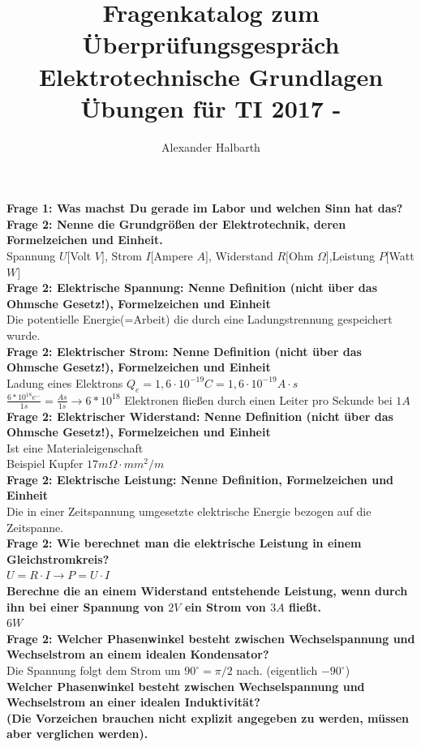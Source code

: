 \documentclass[11pt,a4paper]{scrartcl}
\author{Alexander Halbarth}
\title{\textbf{Fragenkatalog zum Überprüfungsgespräch Elektrotechnische Grundlagen Übungen für TI 2017 - \UE}}
\begin{document}
\maketitle
\textbf{Frage 1: Was machst Du gerade im Labor und welchen Sinn hat das?}\\
\textbf{Frage 2: Nenne die Grundgrößen der Elektrotechnik, deren Formelzeichen und Einheit.}\\
Spannung $U[$Volt $V]$, Strom $I[$Ampere $A]$, Widerstand $R[$Ohm $\Omega]$,Leistung $P[$Watt $W]$\\
\textbf{Frage 2: Elektrische Spannung: Nenne Definition (nicht über das Ohmsche Gesetz!), Formelzeichen und Einheit}\\
Die potentielle Energie(=Arbeit) die durch eine Ladungstrennung gespeichert wurde.\\
\textbf{Frage 2: Elektrischer Strom: Nenne Definition (nicht über das Ohmsche Gesetz!), Formelzeichen und Einheit}\\
Ladung eines Elektrons $Q_e=1,6 \cdot 10^{-19}C=1,6 \cdot 10^{-19}A\cdot s$\\
$\frac{6*10^{18}e^-}{1s}=\frac{As}{1s} \rightarrow 6*10^{18}$ Elektronen fließen durch einen Leiter pro Sekunde bei $1A$\\
\textbf{Frage 2: Elektrischer Widerstand: Nenne Definition (nicht über das Ohmsche Gesetz!), Formelzeichen und Einheit}\\
Ist eine Materialeigenschaft\\
Beispiel Kupfer $17m\Omega \cdot mm^2/m$\\
\textbf{Frage 2: Elektrische Leistung: Nenne Definition, Formelzeichen und Einheit}\\
Die in einer Zeitspannung umgesetzte elektrische Energie bezogen auf die Zeitspanne.\\
\textbf{Frage 2: Wie berechnet man die elektrische Leistung in einem Gleichstromkreis?}\\
$U=R \cdot I \rightarrow P=U \cdot I$\\
\textbf{Berechne die an einem Widerstand entstehende Leistung, wenn durch ihn bei einer Spannung von $2V$ ein Strom von $3A$ fließt.}\\
$6W$\\
\textbf{Frage 2: Welcher Phasenwinkel besteht zwischen Wechselspannung und Wechselstrom an einem idealen Kondensator?}\\
Die Spannung folgt dem Strom um $90^\circ=\pi/2$ nach. (eigentlich $-90^\circ$)\\
\textbf{Welcher Phasenwinkel besteht zwischen Wechselspannung und Wechselstrom an einer idealen Induktivität?\\
(Die Vorzeichen brauchen nicht explizit angegeben zu werden, müssen aber verglichen werden).}\\
\end{document}
